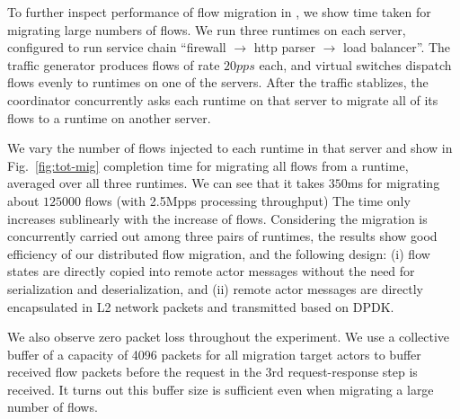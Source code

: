 
To further inspect performance of flow migration in \nfactor, we show time taken for migrating large numbers of flows. We run three runtimes on each server, configured to run service chain ``firewall $\rightarrow$ http parser $\rightarrow$ load balancer''. The traffic generator produces flows of rate $20pps$ each, and virtual switches dispatch flows evenly to runtimes on one of the servers. %
 After the traffic stablizes, the coordinator concurrently asks each runtime on that server to migrate all of its flows to a runtime on another server.

We vary the number of flows injected to each runtime in that server and show in Fig.~\ref{fig:tot-mig} completion time for migrating all flows from a runtime, averaged over all three runtimes. We can see that it takes $350$ms for migrating about $125000$ flows (with 2.5Mpps processing throughput) %
The time only increases sublinearly with the increase of flows. Considering the migration is concurrently carried out among three pairs of runtimes, the results show good efficiency of our distributed flow migration, and the following design:
(i) flow states are directly copied into remote actor messages without the need for serialization and deserialization, and (ii) remote actor messages are directly encapsulated in L2 network packets and transmitted based on DPDK. %

We also observe zero packet loss throughout the experiment. %
 We use a collective buffer of a capacity of 4096 packets for all migration target actors to buffer received flow packets before the request in the 3rd request-response step is received. %
 It turns out this buffer size is sufficient %
 even when migrating a large number of flows. %

